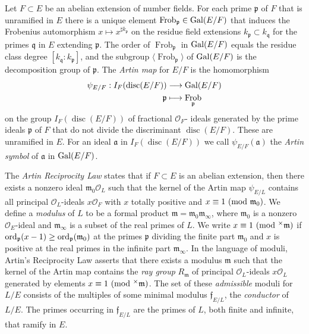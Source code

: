 \documentclass[smallextended]{svjour3}
\def\zmod#1{\,\,({\rm mod}\,\,#1)}
\newcommand{\G}{{\rm Gal}}
\newcommand{\Or}{\mathcal{O}}
\DeclareMathOperator{\frob}{Frob}
\DeclareMathOperator{\disc}{disc}
\begin{document}
Let $F\subset E $ be an abelian extension of number fields. For each prime $\mathfrak p$ of $F$ that is unramified in $E$ there is a unique element $\frob_{\mathfrak p}\in \G(E/F)$ that induces the Frobenius automorphism $x\mapsto x^{\sharp k_{\mathfrak p}}$ on the residue field extensions $k_{\mathfrak p}\subset k_{\mathfrak q}$ for the primes $\mathfrak q $ in $E$ extending $\mathfrak p$. The order of $\frob_{\mathfrak p}$ in $\G(E/F)$ equals the residue class degree $[k_{\mathfrak q}:k_{\mathfrak p}]$, and the subgroup $\langle\frob_{\mathfrak p}\rangle$ of $\G(E/F)$ is the decomposition group of $\mathfrak p$. The \textit{Artin map} for $E/F$ is the homomorphism 
\begin{align*}
	\psi_{E/F}: I_F(\disc(E/F))&\longrightarrow \G(E/F)\\
	\mathfrak p &\longmapsto \frob_{\mathfrak p}
\end{align*}
on the group $I_F(\disc(E/F))$ of fractional $\Or_F$- ideals generated by the prime ideals $\mathfrak p$ of $F$ that do not divide the discriminant $\disc(E/F)$. These are unramified in $E$. For an ideal $\mathfrak a$ in $I_{F}(\disc(E/F))$ we call $\psi_{E/F}(\mathfrak a)$ the \textit{Artin symbol} of $\mathfrak a$ in $\G(E/F)$.

The \textit{Artin Reciprocity Law} states that if $F\subset E$ is an abelian extension, then there exists a nonzero ideal $\mathfrak m_0\Or_L$ such that the kernel of the Artin map $\psi_{E/L}$ contains all principal $\Or_L$-ideals $x\Or_F$ with $x$ totally positive and $x\equiv 1\zmod {\mathfrak m_0}$. 
We define a \emph{modulus} of $L$ to be a formal product $\mathfrak m = \mathfrak m_0 \mathfrak m_\infty$, where $\mathfrak m_0$ is a nonzero $\Or_E$-ideal and $\mathfrak m_\infty$ is a subset of the real primes of $L$. We write $x\equiv 1 \zmod{^{\times}\mathfrak m}$ if $\hbox{ord}_{\mathfrak p}(x-1)\ge\hbox{ord}_{\mathfrak p}(\mathfrak m_0)$ at the primes $\mathfrak p$ dividing the finite part $\mathfrak m_0$ and $x$ is positive at the real primes in the infinite part $\mathfrak m_{\infty}$. 
In the language of moduli, Artin's Reciprocity Law asserts that there exists a modulus $\mathfrak m$ such that the kernel of the Artin map contains the \textit{ray group} $R_{\mathfrak m}$ of principal $\Or_L$-ideals $x\Or_L$ generated by elements $x\equiv 1 \zmod{^{\times}\mathfrak m}$. The set of these \textit{admissible} moduli for $L/E$ consists of the multiples of some minimal modulus $\mathfrak f_{E/L}$, the \textit{conductor} of $L/E$. The primes occurring in $\mathfrak f_{E/L}$ are the primes of $L$, both finite and infinite, that ramify in $E$. 
 
\end{document}
